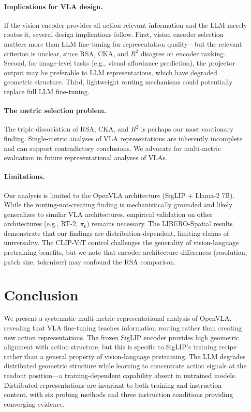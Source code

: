 \documentclass[letterpaper]{article}
\begin{document}
\paragraph{Implications for VLA design.}
If the vision encoder provides all action-relevant information and the LLM merely routes it, several design implications follow. First, vision encoder selection matters more than LLM fine-tuning for representation quality---but the relevant criterion is unclear, since RSA, CKA, and $R^2$ disagree on encoder ranking. Second, for image-level tasks (e.g., visual affordance prediction), the projector output may be preferable to LLM representations, which have degraded geometric structure. Third, lightweight routing mechanisms could potentially replace full LLM fine-tuning.

\paragraph{The metric selection problem.}
The triple dissociation of RSA, CKA, and $R^2$ is perhaps our most cautionary finding. Single-metric analyses of VLA representations are inherently incomplete and can support contradictory conclusions. We advocate for multi-metric evaluation in future representational analyses of VLAs.

\paragraph{Limitations.}
Our analysis is limited to the OpenVLA architecture (SigLIP + Llama-2 7B). While the routing-not-creating finding is mechanistically grounded and likely generalizes to similar VLA architectures, empirical validation on other architectures (e.g., RT-2, $\pi_0$) remains necessary. The LIBERO-Spatial results demonstrate that our findings are distribution-dependent, limiting claims of universality. The CLIP-ViT control challenges the generality of vision-language pretraining benefits, but we note that encoder architecture differences (resolution, patch size, tokenizer) may confound the RSA comparison.

\section{Conclusion}
\label{sec:conclusion}

We present a systematic multi-metric representational analysis of OpenVLA, revealing that VLA fine-tuning teaches information routing rather than creating new action representations. The frozen SigLIP encoder provides high geometric alignment with action structure, but this is specific to SigLIP's training recipe rather than a general property of vision-language pretraining. The LLM degrades distributed geometric structure while learning to concentrate action signals at the readout position---a training-dependent capability absent in untrained models. Distributed representations are invariant to both training and instruction content, with six probing methods and three instruction conditions providing converging evidence.
\end{document}
